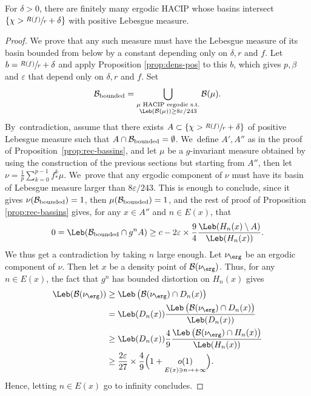 \begin{prop}
\label{prop:fini}
For $\delta > 0$, there are finitely many ergodic HACIP whose basins intersect $\left \{ \chi > \sfrac{R(f)}{r} + \delta\right\}$ with positive Lebesgue measure.
\end{prop}

\begin{proof}
We prove that any such measure must have the Lebesgue measure of its basin bounded from below by a constant depending only on $\delta, r$ and $f$.
Let $b = \sfrac{R(f)}{r} + \delta$ and apply Proposition \ref{prop:dens-pos} to this $b$, which gives $p, \beta$ and $\varepsilon$ that depend only on $\delta, r$ and $f$. Set
\[
\mathcal{B}_{\textup{bounded}} = \bigcup_{
\substack{
\mu \text{ HACIP ergodic s.t.}\\
\Leb(\mathcal{B}(\mu)) \geq 8 \varepsilon / 243
}} \mathcal{B}(\mu).
\]
By~contradiction, assume that there exists $A \subset \left \{ \chi > \sfrac{R(f)}{r} + \delta\right\}$ of positive Lebesgue measure such that $A \cap \mathcal{B}_{\textup{bounded}} = \emptyset$. We~define $A', A''$ as in the proof of Proposition~\ref{prop:rec-bassins}, and let $\mu$ be a $g$-invariant measure obtained by using the construction of the previous sections but starting from $A''$, then let $\nu = \frac{1}{p}\sum_{k=0}^{p-1} f^k_* \mu$. We~prove that any ergodic component of $\nu$ must have its basin of Lebesgue measure larger than ${8 \varepsilon}/{243}$.
This is enough to conclude, since it gives $\nu(\mathcal{B}_{\textup{bounded}}) = 1$, then $\mu(\mathcal{B}_{\textup{bounded}}) = 1$, and the rest of proof of Proposition \ref{prop:rec-bassins} gives, for any $x \in A''$ and $n \in E(x)$, that
\[
0 = \Leb(\mathcal{B}_{\textup{bounded}} \cap g^n A) \geq c - 2 \varepsilon \times \frac{9}{4} \frac{\Leb(H_n(x) \setminus A)}{\Leb(H_n(x))}.
\]
We thus get a contradiction by taking $n$ large enough.
Let $\nu_{\erg}$ be an ergodic component of $\nu$.
Then let $x$ be a density point of $\mathcal{B}(\nu_{\erg})$.
Thus, for any $n \in E(x)$, the fact that $g^n$ has bounded distortion on $H_n(x)$ gives
\begin{align*}
\Leb(\mathcal{B}(\nu_{\erg})) &\geq \Leb\left (\mathcal{B}(\nu_{\erg}) \cap D_n(x) \right)\\
&= \Leb (D_n(x)) \frac{\Leb\left (\mathcal{B}(\nu_{\erg}) \cap D_n(x) \right)}{\Leb (D_n(x))}\\
&\geq \Leb (D_n(x)) \frac{4}{9} \frac{\Leb \left (\mathcal{B}(\nu_{\erg}) \cap H_n(x) \right)}{\Leb(H_n(x))}\\
&\geq \frac{2 \varepsilon}{27} \times \frac{4}{9} \Bigl (1 + \underset{E(x) \ni n\to +\infty}{o(1)} \Bigr).
\end{align*}
Hence, letting $n \in E(x)$ go to infinity concludes.
\end{proof}

